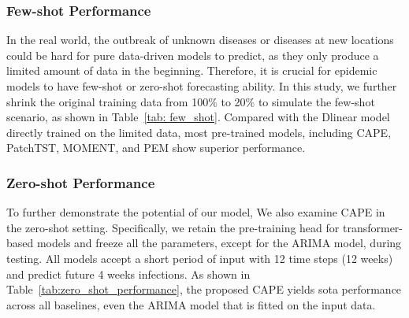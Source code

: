 


\subsubsection{Few-shot Performance} %

In the real world, the outbreak of unknown diseases or diseases at new locations could be hard for pure data-driven models to predict, as they only produce a limited amount of data in the beginning. Therefore, it is crucial for epidemic models to have few-shot or zero-shot forecasting ability. In this study, we further shrink the original training data from 100\% to 20\% to simulate the few-shot scenario, as shown in Table~\ref{tab: few_shot}. Compared with the Dlinear model directly trained on the limited data, most pre-trained models, including CAPE, PatchTST, MOMENT, and PEM show superior performance. 



\subsubsection{Zero-shot Performance} %
To further demonstrate the potential of our model, We also examine CAPE in the zero-shot setting. Specifically, we retain the pre-training head for transformer-based models and freeze all the parameters, except for the ARIMA model, during testing. All models accept a short period of input with 12 time steps (12 weeks) and predict future 4 weeks infections. As shown in Table~\ref{tab:zero_shot_performance}, the proposed CAPE yields sota performance across all baselines, even the ARIMA model that is fitted on the input data. 







